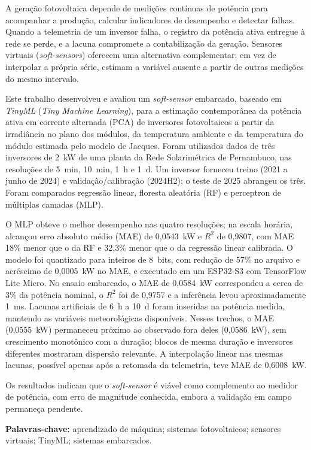 \setlength{\absparsep}{18pt}
\begin{resumo}
A geração fotovoltaica depende de medições contínuas de potência para acompanhar
a produção, calcular indicadores de desempenho e detectar falhas. Quando a
telemetria de um inversor falha, o registro da potência ativa entregue à rede se
perde, e a lacuna compromete a contabilização da geração. Sensores virtuais
(\textit{soft-sensors}) oferecem uma alternativa complementar: em vez de
interpolar a própria série, estimam a
variável ausente a partir de outras medições do mesmo intervalo.

Este trabalho desenvolveu e avaliou um \textit{soft-sensor} embarcado, baseado em
\textit{TinyML} (\textit{Tiny Machine Learning}), para a estimação contemporânea
da potência ativa em corrente alternada (PCA) de inversores fotovoltaicos a partir
da irradiância no plano dos módulos, da temperatura ambiente e da temperatura do
módulo estimada pelo modelo de Jacques. Foram utilizados dados de três inversores
de 2~kW de uma planta da Rede Solarimétrica de Pernambuco, nas resoluções de
5~min, 10~min, 1~h e 1~d. Um inversor forneceu treino (2021 a junho de 2024) e
validação/calibração (2024H2); o teste de 2025 abrangeu os três. Foram comparados
regressão linear, floresta aleatória (RF) e perceptron de múltiplas camadas (MLP).

O MLP obteve o melhor desempenho nas quatro resoluções; na escala horária,
alcançou erro absoluto médio (MAE) de 0,0543~kW e $R^2$ de 0,9807, com MAE 18\%
menor que o da RF e 32,3\% menor que o da regressão linear calibrada. O modelo
foi quantizado para inteiros de 8~bits, com redução de 57\% no arquivo e acréscimo
de 0,0005~kW no MAE, e executado em um ESP32-S3 com TensorFlow Lite Micro. No
ensaio embarcado, o MAE de 0,0584~kW correspondeu a cerca de 3\% da potência
nominal, o $R^2$ foi de 0,9757 e a inferência levou aproximadamente 1~ms. Lacunas
artificiais de 6~h a 10~d foram inseridas na potência medida, mantendo as
variáveis meteorológicas disponíveis. Nesses trechos, o MAE (0,0555~kW)
permaneceu próximo ao observado fora deles (0,0586~kW), sem crescimento monotônico
com a duração; blocos de mesma duração e inversores diferentes mostraram
dispersão relevante. A interpolação linear nas mesmas lacunas, possível apenas
após a retomada da telemetria, teve MAE de 0,6008~kW.

Os resultados indicam que o \textit{soft-sensor} é viável como complemento ao
medidor de potência, com erro de magnitude conhecida, embora a validação em campo
permaneça pendente.

\noindent\textbf{Palavras-chave:} aprendizado de máquina; sistemas fotovoltaicos;
sensores virtuais; TinyML; sistemas embarcados.
\end{resumo}

